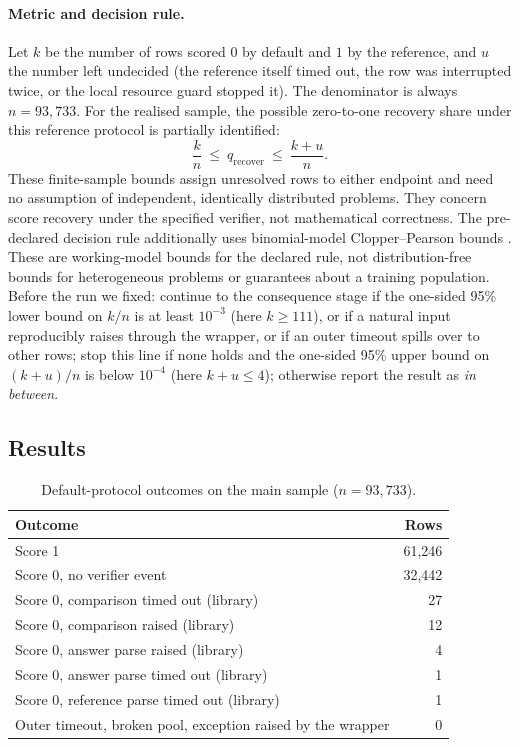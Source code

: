 \documentclass[10pt,a4paper]{article}
\let\cite\citep
\begin{document}
\paragraph{Metric and decision rule.}
Let $k$ be the number of rows scored $0$ by default and $1$ by the reference,
and $u$ the number left undecided (the reference itself timed out, the row was
interrupted twice, or the local resource guard stopped it). The denominator is
always $n=93{,}733$. For the realised sample, the possible zero-to-one
recovery share under this reference protocol is partially identified:
\[
  \frac{k}{n}\ \leq\ q_{\mathrm{recover}}\ \leq\ \frac{k+u}{n}.
\]
These finite-sample bounds assign unresolved rows to either endpoint and
need no assumption of independent, identically distributed problems.
They concern score recovery under the specified verifier, not mathematical
correctness. The pre-declared decision rule additionally uses binomial-model
Clopper--Pearson bounds \cite{clopper1934}. These are working-model bounds
for the declared rule, not distribution-free bounds for heterogeneous
problems or guarantees about a training population.
Before the run we fixed: continue to the consequence stage if the one-sided
95\% lower bound on $k/n$ is at least $10^{-3}$ (here $k\ge111$), or if a
natural input reproducibly raises through the wrapper, or if an outer timeout
spills over to other rows; stop this line if none holds and the one-sided
95\% upper bound on $(k+u)/n$ is below $10^{-4}$ (here $k+u\le4$); otherwise
report the result as \emph{in between}.

\subsection{Results}

\begin{table}[h]
\centering
\caption{Default-protocol outcomes on the main sample ($n=93{,}733$).}
\label{tab:default}
\small
\begin{tabular}{@{}lr@{}}
\toprule
Outcome & Rows \\
\midrule
Score 1 & 61,246 \\
Score 0, no verifier event & 32,442 \\
Score 0, comparison timed out (library) & 27 \\
Score 0, comparison raised (library) & 12 \\
Score 0, answer parse raised (library) & 4 \\
Score 0, answer parse timed out (library) & 1 \\
Score 0, reference parse timed out (library) & 1 \\
Outer timeout, broken pool, exception raised by the wrapper & 0 \\
\bottomrule
\end{tabular}
\end{table}
\end{document}
